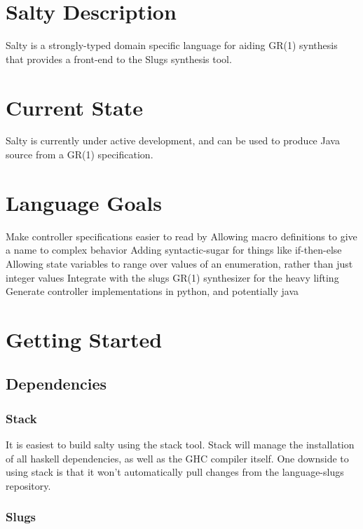 
\section{Salty Description}

Salty is a strongly-typed domain specific language for aiding GR(1) synthesis that provides a front-end to the Slugs synthesis tool. 

\section{Current State}

Salty is currently under active development, and can be used to produce Java source from a GR(1) specification.

\section{Language Goals}

Make controller specifications easier to read by
Allowing macro definitions to give a name to complex behavior
Adding syntactic-sugar for things like if-then-else
Allowing state variables to range over values of an enumeration, rather than just integer values
Integrate with the slugs GR(1) synthesizer for the heavy lifting
Generate controller implementations in python, and potentially java

\section{Getting Started}

\subsection{Dependencies}

\subsubsection{Stack}

It is easiest to build salty using the stack tool. Stack will manage the installation of all haskell dependencies, as well as the GHC compiler itself. One downside to using stack is that it won't automatically pull changes from the language-slugs repository.

\subsubsection{Slugs}

